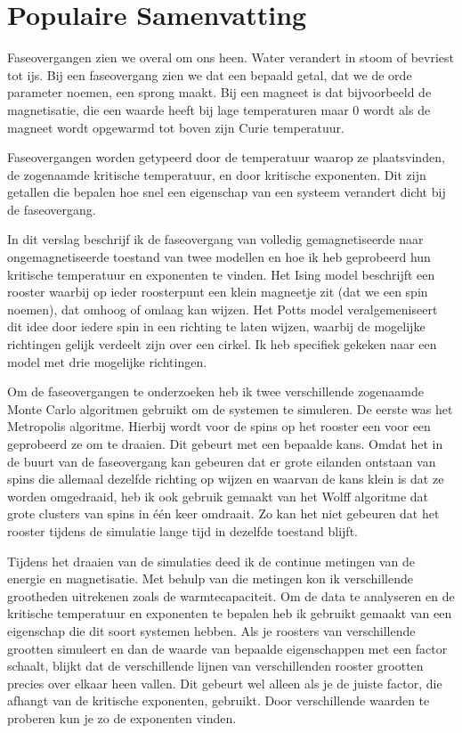 \documentclass[11pt, a4paper]{report} %
\begin{document}
\newpage
\thispagestyle{plain}
\section*{Populaire Samenvatting}
Faseovergangen zien we overal om ons heen. Water verandert in stoom of bevriest tot ijs.
Bij een faseovergang zien we dat een bepaald getal, dat we de orde parameter noemen, een sprong maakt.
Bij een magneet is dat bijvoorbeeld de magnetisatie, die een waarde heeft bij lage temperaturen maar 0 wordt als de magneet wordt opgewarmd tot boven zijn Curie temperatuur.

Faseovergangen worden getypeerd door de temperatuur waarop ze plaatsvinden, de zogenaamde kritische temperatuur, en door kritische exponenten.
Dit zijn getallen die bepalen hoe snel een eigenschap van een systeem verandert dicht bij de faseovergang.

In dit verslag beschrijf ik de faseovergang van volledig gemagnetiseerde naar ongemagnetiseerde toestand van twee modellen en hoe ik heb geprobeerd hun kritische temperatuur en exponenten te vinden.
Het Ising model beschrijft een rooster waarbij op ieder roosterpunt een klein magneetje zit (dat we een spin noemen), dat omhoog of omlaag kan wijzen.
Het Potts model veralgemeniseert dit idee door iedere spin in een richting te laten wijzen, waarbij de mogelijke richtingen gelijk verdeelt zijn over een cirkel.
Ik heb specifiek gekeken naar een model met drie mogelijke richtingen.

Om de faseovergangen te onderzoeken heb ik twee verschillende zogenaamde Monte Carlo algoritmen gebruikt om de systemen te simuleren.
De eerste was het Metropolis algoritme.
Hierbij wordt voor de spins op het rooster een voor een geprobeerd ze om te draaien. Dit gebeurt met een bepaalde kans.
Omdat het in de buurt van de faseovergang kan gebeuren dat er grote eilanden ontstaan van spins die allemaal dezelfde richting op wijzen en waarvan de kans klein is dat ze worden omgedraaid, heb ik ook gebruik gemaakt van het Wolff algoritme dat grote clusters van spins in één keer omdraait.
Zo kan het niet gebeuren dat het rooster tijdens de simulatie lange tijd in dezelfde toestand blijft.

Tijdens het draaien van de simulaties deed ik de  continue metingen van de energie en magnetisatie.
Met behulp van die metingen kon ik verschillende grootheden uitrekenen zoals de warmtecapaciteit.
Om de data te analyseren en de kritische temperatuur en exponenten te bepalen  heb ik gebruikt gemaakt van een eigenschap die dit soort systemen hebben.
Als je roosters van verschillende grootten simuleert en dan de waarde van bepaalde eigenschappen met een factor schaalt, blijkt dat de verschillende lijnen van verschillenden rooster grootten precies over elkaar heen vallen.
Dit gebeurt wel alleen als je de juiste factor, die afhangt van de kritische exponenten, gebruikt.
Door verschillende waarden te proberen kun je zo de exponenten vinden.
\end{document}
